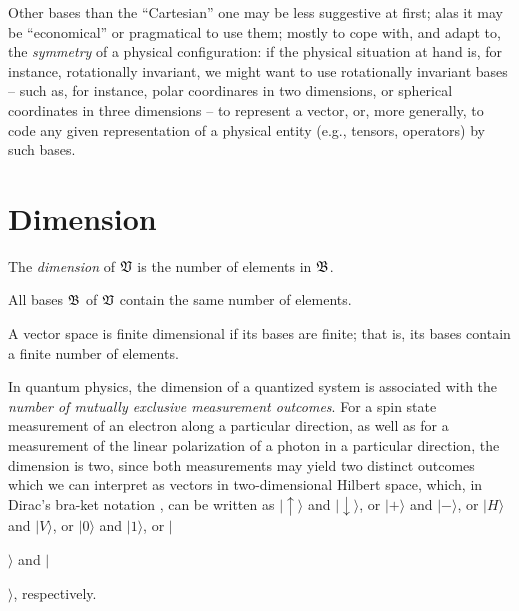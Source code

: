Other bases than the ``Cartesian'' one may be less suggestive at first; alas it may be ``economical'' or pragmatical to use them;
mostly to cope with, and adapt to, the {\em symmetry} of a physical configuration:
if the physical situation at hand is, for instance, rotationally invariant,
we might want to use rotationally invariant bases --
such as, for instance, polar coordinares in two dimensions, or spherical coordinates in three dimensions --
to represent a vector, or, more generally, to code any given representation of a physical entity
(e.g., tensors, operators) by such bases.


\section{Dimension}
The {\em dimension}
of $\frak V$ is the number of elements in $\frak B$.

All bases $\frak B$ of $\frak V$ contain the same number of elements.

A vector space is finite dimensional if its bases are finite; that is, its bases
contain a finite number of elements.

{\color{Purple}
In quantum physics, the dimension of a quantized system is associated with
the {\em number of mutually exclusive measurement outcomes}.
For a spin state measurement of an electron
along a particular direction,
as well as for a measurement of the linear polarization
of a photon in a particular direction,
the dimension is two, since both measurements
may yield two distinct outcomes
which we can
interpret as vectors in two-dimensional Hilbert space,
which, in Dirac's bra-ket notation \cite{dirac}, can be written as
$
\vert \uparrow \rangle$ and $\vert \downarrow \rangle$,
or $\vert + \rangle$ and $
\vert - \rangle
$,
or
$
\vert H \rangle $ and $
\vert V \rangle
$,
or
$
\vert 0 \rangle $ and $
\vert 1 \rangle
$,
or
$
\mid$$\rangle $ and $
\mid$$\rangle
$,
respectively.
}

